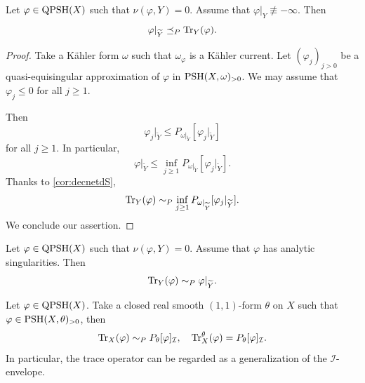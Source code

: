 \begin{proposition}\label{prop:Trdominarest}
    Let $\varphi\in \mathrm{QPSH}(X)$ such that $\nu(\varphi,Y)=0$.
    Assume that $\varphi|_Y\not\equiv -\infty$.
    Then
    \[
    \varphi|_{\widetilde{Y}}\preceq_P \operatorname{Tr}_Y(\varphi).
    \]
\end{proposition}
\begin{proof}
    Take a Kähler form $\omega$ such that $\omega_{\varphi}$ is a Kähler current.
    Let $(\varphi_j)_{j>0}$ be a quasi-equisingular approximation of $\varphi$ in $\mathrm{PSH}(X,\omega)_{>0}$.
    We may assume that $\varphi_j\leq 0$ for all $j\geq 1$.


    Then
    \begin{equation}\label{eq:varphijrestrleqPtemp}
    \varphi_j|_{\widetilde{Y}}\leq P_{\omega|_{\widetilde{Y}}}\left[\varphi_j|_{\widetilde{Y}}\right]
    \end{equation}
    for all $j\geq 1$. In particular,
    \[
    \varphi|_{\widetilde{Y}}\leq \inf_{j\geq 1}P_{\omega|_{\widetilde{Y}}}\left[\varphi_j|_{\widetilde{Y}}\right].
    \]
    Thanks to \cref{cor:decnetdS},
\begin{equation}\label{eq:TrYnewexpression}
\operatorname{Tr}_Y(\varphi)\sim_P \inf_{j\geq 1} P_{\omega|_{\widetilde{Y}}}[\varphi_j|_{\widetilde{Y}}].
\end{equation}
  We conclude our assertion.
\end{proof}

\begin{example}\label{ex:resanalyt}
    Let $\varphi\in \mathrm{QPSH}(X)$ such that $\nu(\varphi,Y)=0$. Assume that $\varphi$ has analytic singularities. Then
    \[
        \operatorname{Tr}_Y(\varphi)\sim_P \varphi|_{\widetilde{Y}}.
    \]
\end{example}

\begin{example}\label{ex:trace:L236}
    Let $\varphi\in \mathrm{QPSH}(X)$. Take a closed real smooth $(1,1)$-form $\theta$ on $X$ such that $\varphi\in \mathrm{PSH}(X,\theta)_{>0}$, then
    \[
        \operatorname{Tr}_X(\varphi)\sim_P P_{\theta}[\varphi]_{\mathcal{I}},\quad   \operatorname{Tr}^{\theta}_X(\varphi) = P_{\theta}[\varphi]_{\mathcal{I}}.
    \]
    In particular, the trace operator can be regarded as a generalization of the $\mathcal{I}$-envelope.
\end{example}

